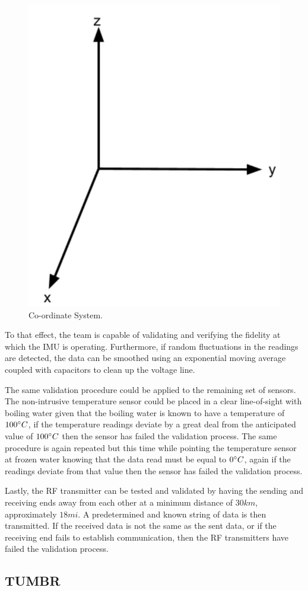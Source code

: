 \begin{figure}[H]
  \centering
  \includegraphics[width=.3\textwidth]{Controls/coordinate_system.png}
  \caption{\label{fig:coordinate_system} Co-ordinate System.}
\end{figure}

To that effect, the team is capable of validating and verifying the fidelity at which the IMU is operating. Furthermore, if random fluctuations in the readings are detected, the data can be smoothed using an exponential moving average coupled with capacitors to clean up the voltage line.

The same validation procedure could be applied to the remaining set of sensors. The non-intrusive temperature sensor could be placed in a clear line-of-sight with boiling water given that the boiling water is known to have a temperature of $100\degree C$, if the temperature readings deviate by a great deal from the anticipated value of $100\degree C$ then the sensor has failed the validation process. The same procedure is again repeated but this time while pointing the temperature sensor at frozen water knowing that the data read must be equal to $0\degree C$, again if the readings deviate from that value then the sensor has failed the validation process.

Lastly, the RF transmitter can be tested and validated by having the sending and receiving ends away from each other at a minimum distance of $30km$, approximately $18mi$. A predetermined and known string of data is then transmitted. If the received data is not the same as the sent data, or if the receiving end fails to establish communication, then the RF transmitters have failed the validation process.


\subsection{TUMBR}

